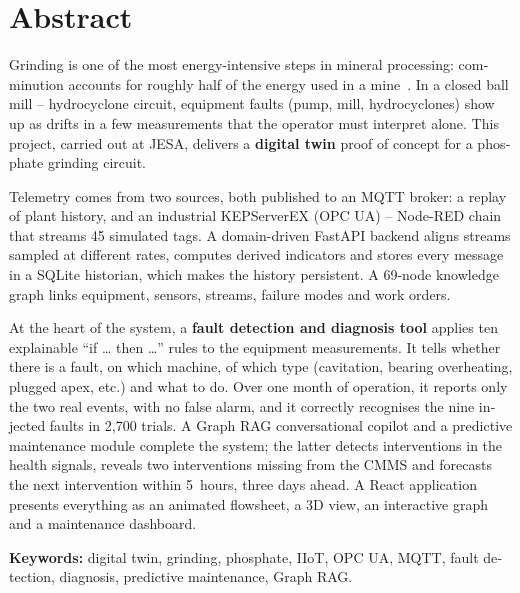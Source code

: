 \chapter*{Abstract}
\begin{otherlanguage}{english}

Grinding is one of the most energy-intensive steps in mineral processing: comminution accounts for roughly half of the energy used in a mine~\cite{jeswiet2016}. In a closed ball mill -- hydrocyclone circuit, equipment faults (pump, mill, hydrocyclones) show up as drifts in a few measurements that the operator must interpret alone. This project, carried out at JESA, delivers a \textbf{digital twin} proof of concept for a phosphate grinding circuit.

Telemetry comes from two sources, both published to an MQTT broker: a replay of plant history, and an industrial KEPServerEX (OPC UA) -- Node-RED chain that streams 45 simulated tags. A domain-driven FastAPI backend aligns streams sampled at different rates, computes derived indicators and stores every message in a SQLite historian, which makes the history persistent. A 69-node knowledge graph links equipment, sensors, streams, failure modes and work orders.

At the heart of the system, a \textbf{fault detection and diagnosis tool} applies ten explainable ``if … then …'' rules to the equipment measurements. It tells whether there is a fault, on which machine, of which type (cavitation, bearing overheating, plugged apex, etc.) and what to do. Over one month of operation, it reports only the two real events, with no false alarm, and it correctly recognises the nine injected faults in 2,700 trials. A Graph RAG conversational copilot and a predictive maintenance module complete the system; the latter detects interventions in the health signals, reveals two interventions missing from the CMMS and forecasts the next intervention within 5~hours, three days ahead. A React application presents everything as an animated flowsheet, a 3D view, an interactive graph and a maintenance dashboard.

\medskip
\noindent\textbf{Keywords:} digital twin, grinding, phosphate, IIoT, OPC UA, MQTT, fault detection, diagnosis, predictive maintenance, Graph RAG.
\end{otherlanguage}
